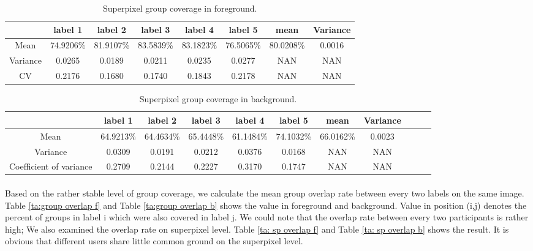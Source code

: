 \documentclass[runningheads,a4paper]{llncs}
\begin{document}
\begin{table}
\centering
\begin{tabular}{|c|c|c|c|c|c|c|c|}
\hline
 & label 1 & label 2&label 3&label 4&label 5&mean&Variance\\
\hline
Mean& 74.9206\% & 81.9107\% & 83.5839\%& 83.1823\%& 76.5065\%&80.0208\%&0.0016 \\
\hline
Variance& 0.0265 & 0.0189 & 0.0211& 0.0235& 0.0277&NAN&NAN \\
\hline
CV& 0.2176 & 0.1680 & 0.1740& 0.1843& 0.2178&NAN&NAN \\
\hline
\end{tabular}
\caption{Superpixel group coverage in foreground.}
\label{ta: label coverage f}
\end{table}

\begin{table}
\centering
\begin{tabular}{|c|c|c|c|c|c|c|c|c|c|c|}
\hline
 & label 1 & label 2&label 3&label 4&label 5&mean&Variance \\
\hline
Mean& 64.9213\% & 64.4634\% & 65.4448\%& 61.1484\%& 74.1032\%&66.0162\%&0.0023 \\
\hline
Variance& 0.0309 & 0.0191 & 0.0212& 0.0376& 0.0168&NAN&NAN \\
\hline
Coefficient of variance& 0.2709 & 0.2144 & 0.2227& 0.3170& 0.1747&NAN&NAN \\
\hline
\end{tabular}
\caption{Superpixel group coverage in background.}
\label{ta: label coverage b}
\end{table}


\paragraph{} Based on the rather stable level of group coverage, we calculate the mean group overlap rate between every two labels on the same image. Table \ref{ta:group overlap f} and Table \ref{ta:group overlap b}  shows the value in foreground and background. Value in position (i,j) denotes the percent of groups in label i which were also covered in label j. We could note that the overlap rate between every two participants is rather high; We also examined the overlap rate on superpixel level. Table \ref{ta: sp overlap f} and Table \ref{ta: sp overlap b} shows the result. It is obvious that different users share little common ground on the superpixel level.
\end{document}
